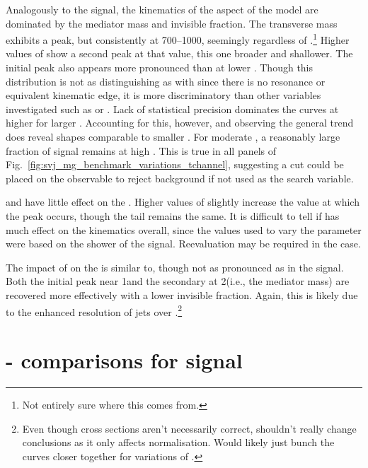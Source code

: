 Analogously to the \schannel signal, the kinematics of the \tchannel aspect of the model are dominated by the mediator mass and invisible fraction. The transverse mass exhibits a peak, but consistently at 700--1000\GeV, seemingly regardless of \mBifund.\footnote{Not entirely sure where this comes from.} Higher values of \mBifund show a second peak at that value, this one broader and shallower. The initial peak also appears more pronounced than at lower \mPhi. Though this distribution is not as distinguishing as with \schannel since there is no resonance or equivalent kinematic edge, it is more discriminatory than other variables investigated such as \ptmiss or \HT. Lack of statistical precision dominates the curves at higher \mT for larger \mPhi. Accounting for this, however, and observing the general trend does reveal shapes comparable to smaller \mPhi. For moderate \mPhi, a reasonably large fraction of signal remains at high \mT. This is true in all panels of Fig.~\ref{fig:svj_mg_benchmark_variations_tchannel}, suggesting a cut could be placed on the observable to reject background if not used as the search variable.

\mDark and \aDark have little effect on the \mT. Higher values of \mDark slightly increase the value at which the peak occurs, though the tail remains the same. It is difficult to tell if \aDark has much effect on the kinematics overall, since the values used to vary the parameter were based on the shower of the \schannel signal. Reevaluation may be required in the \tchannel case.

The impact of \rinv on the \mT is similar to, though not as pronounced as in the \schannel signal. Both the initial peak near 1\TeV and the secondary at 2\TeV (i.e., the mediator mass) are recovered more effectively with a lower invisible fraction. Again, this is likely due to the enhanced resolution of \glspl{jet} over \ptmiss.\footnote{Even though cross sections aren't necessarily correct, shouldn't really change conclusions as it only affects normalisation. Would likely just bunch the curves closer together for variations of \mPhi.}




\section{\texorpdfstring{\PYTHIA}{Pythia}-\texorpdfstring{\MADGRAPH}{MadGraph} comparisons for \texorpdfstring{\schannel}{s-channel} signal}
\label{sec:svj_schannel_comparisons}

